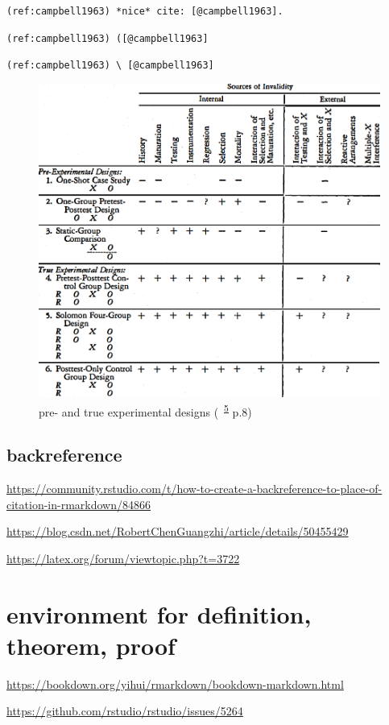 \documentclass[
]{book}
\theoremstyle{definition}
\theoremstyle{definition}
\theoremstyle{definition}
\theoremstyle{definition}
\theoremstyle{remark}
\begin{document}
\texttt{(ref:campbell1963)\ *nice*\ cite:\ {[}@campbell1963{]}.}

\texttt{(ref:campbell1963)\ ({[}@campbell1963{]}}

\texttt{(ref:campbell1963)\ \textbackslash{}\ {[}@campbell1963{]}}



\begin{figure}
\includegraphics[width=0.65\linewidth]{img/pre-and-true-experimental-designs} \caption{pre- and true experimental designs (~\textsuperscript{\protect\hyperlink{ref-campbell1963}{5}} p.8)}\label{fig:unnamed-chunk-52}
\end{figure}

\hypertarget{backreference}{%
\subsection{backreference}\label{backreference}}

\url{https://community.rstudio.com/t/how-to-create-a-backreference-to-place-of-citation-in-rmarkdown/84866}

\url{https://blog.csdn.net/RobertChenGuangzhi/article/details/50455429}

\url{https://latex.org/forum/viewtopic.php?t=3722}

\hypertarget{environment-for-definition-theorem-proof}{%
\section{environment for definition, theorem, proof}\label{environment-for-definition-theorem-proof}}

\url{https://bookdown.org/yihui/rmarkdown/bookdown-markdown.html}

\url{https://github.com/rstudio/rstudio/issues/5264}
\end{document}
